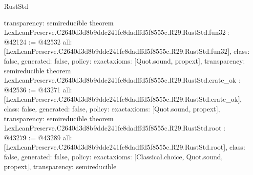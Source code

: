 \begin{lexlean}{RustStd}
\begin{coremodule}
{  transparency: semireducible
}
theorem LexLeanPreserve.C2640d3d8b9ddc241fe8dadffd5f8555c.R29.RustStd.fun32 : @42124 := @42532 {
  all: [LexLeanPreserve.C2640d3d8b9ddc241fe8dadffd5f8555c.R29.RustStd.fun32],
  class: false,
  generated: false,
  policy: exact{axioms: [Quot.sound, propext]},
  transparency: semireducible
}
theorem LexLeanPreserve.C2640d3d8b9ddc241fe8dadffd5f8555c.R29.RustStd.crate_ok : @42536 := @43271 {
  all: [LexLeanPreserve.C2640d3d8b9ddc241fe8dadffd5f8555c.R29.RustStd.crate_ok],
  class: false,
  generated: false,
  policy: exact{axioms: [Quot.sound, propext]},
  transparency: semireducible
}
theorem LexLeanPreserve.C2640d3d8b9ddc241fe8dadffd5f8555c.R29.RustStd.root : @43279 := @43289 {
  all: [LexLeanPreserve.C2640d3d8b9ddc241fe8dadffd5f8555c.R29.RustStd.root],
  class: false,
  generated: false,
  policy: exact{axioms: [Classical.choice, Quot.sound, propext]},
  transparency: semireducible
}


\end{coremodule}
\end{lexlean}
